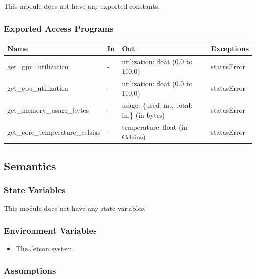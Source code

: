 \documentclass[12pt, titlepage]{article}
\begin{document}
This module does not have any exported constants.

\subsubsection{Exported Access Programs}

\begin{center}
  \begin{tabular}{p{3cm} p{4cm} p{4cm} p{3.5cm}}
    \hline
    \textbf{Name}                   & \textbf{In} & \textbf{Out}                                & \textbf{Exceptions} \\
    \hline
    get\_gpu\_utilization           & -           & utilization: float (0.0 to 100.0)           & statusError         \\
    \hline
    get\_cpu\_utilization           & -           & utilization: float (0.0 to 100.0)           & statusError         \\
    \hline
    get\_memory\_usage\_bytes       & -           & usage: \{used: int, total: int\} (in bytes) & statusError         \\
    \hline
    get\_core\_temperature\_celsius & -           & temperature: float (in Celsius)             & statusError         \\
    \hline
  \end{tabular}
\end{center}

\subsection{Semantics}

\subsubsection{State Variables}

This module does not have any state variables.

\subsubsection{Environment Variables}

\begin{itemize}
  \item The Jetson system.
\end{itemize}

\subsubsection{Assumptions}
\end{document}
